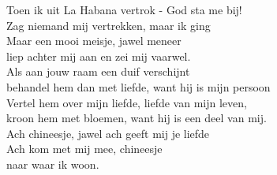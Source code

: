 \clearpage
\begin{translation}
Toen ik uit La Habana vertrok - God sta me bij!\\
Zag niemand mij vertrekken, maar ik ging\\
Maar een mooi meisje, jawel meneer\\
liep achter mij aan en zei mij vaarwel.\\
\vspace*{1\baselineskip}
Als aan jouw raam een duif verschijnt\\
behandel hem dan met liefde, want hij is mijn persoon\\
Vertel hem over mijn liefde, liefde van mijn leven,\\
kroon hem met bloemen, want hij is een deel van mij.\\
\vspace*{1\baselineskip}
Ach chineesje, jawel ach geeft mij je liefde\\
Ach kom met mij mee, chineesje\\
naar waar ik woon.
\end{translation}

